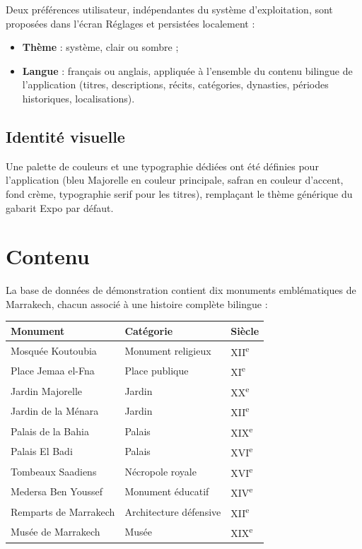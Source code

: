 \documentclass[11pt,a4paper]{article}
\begin{document}
Deux préférences utilisateur, indépendantes du système d'exploitation, sont proposées dans l'écran Réglages et persistées localement :

\begin{itemize}[nosep]
    \item \textbf{Thème} : système, clair ou sombre ;
    \item \textbf{Langue} : français ou anglais, appliquée à l'ensemble du contenu bilingue de l'application (titres, descriptions, récits, catégories, dynasties, périodes historiques, localisations).
\end{itemize}

\subsection{Identité visuelle}

Une palette de couleurs et une typographie dédiées ont été définies pour l'application (bleu Majorelle en couleur principale, safran en couleur d'accent, fond crème, typographie serif pour les titres), remplaçant le thème générique du gabarit Expo par défaut.

\section{Contenu}

La base de données de démonstration contient dix monuments emblématiques de Marrakech, chacun associé à une histoire complète bilingue :

\begin{center}
\begin{longtable}{@{}p{5.5cm}p{3.5cm}p{2cm}@{}}
\toprule
\textbf{Monument} & \textbf{Catégorie} & \textbf{Siècle} \\
\midrule
Mosquée Koutoubia & Monument religieux & XII\textsuperscript{e} \\
Place Jemaa el-Fna & Place publique & XI\textsuperscript{e} \\
Jardin Majorelle & Jardin & XX\textsuperscript{e} \\
Jardin de la Ménara & Jardin & XII\textsuperscript{e} \\
Palais de la Bahia & Palais & XIX\textsuperscript{e} \\
Palais El Badi & Palais & XVI\textsuperscript{e} \\
Tombeaux Saadiens & Nécropole royale & XVI\textsuperscript{e} \\
Medersa Ben Youssef & Monument éducatif & XIV\textsuperscript{e} \\
Remparts de Marrakech & Architecture défensive & XII\textsuperscript{e} \\
Musée de Marrakech & Musée & XIX\textsuperscript{e} \\
\bottomrule
\end{longtable}
\end{center}
\end{document}
